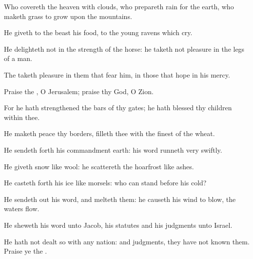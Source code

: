 {\par }{\Q {}Who
covereth the
heaven with
clouds, who
prepareth
rain for the
earth, who maketh
grass to
grow upon the
mountains.


\par }{\Q {}He
giveth to the
beast his
food,
{} to the
young
ravens which
cry.


\par }{\Q {}He
delighteth not in the
strength of the
horse: he taketh not
pleasure in the
legs of a
man.


\par }{\Q {}The
{} taketh
pleasure in them that
fear him, in those that
hope in his
mercy.


\par }{\BB \par }
{\Q {}Praise the
{}, O
Jerusalem;
praise thy
God, O
Zion.


\par }{\Q {}For he hath
strengthened the
bars of thy
gates; he hath
blessed thy
children
within thee.


\par }{\Q {}He
maketh
peace
{} thy
borders,
{}
filleth thee with the
finest of the
wheat.


\par }{\Q {}He sendeth
forth his
commandment
{}
earth: his
word
runneth very
swiftly.


\par }{\Q {}He
giveth
snow like
wool: he
scattereth the
hoarfrost like
ashes.


\par }{\Q {}He casteth
forth his
ice like
morsels: who can
stand
before his
cold?


\par }{\Q {}He sendeth
out his
word, and
melteth them: he causeth his
wind to
blow,
{} the
waters
flow.


\par }{\Q {}He
sheweth his
word unto
Jacob, his
statutes and his
judgments unto
Israel.


\par }{\Q {}He hath not
dealt so with any
nation: and
{}
judgments, they have not
known them.
Praise ye the
{}.




}
